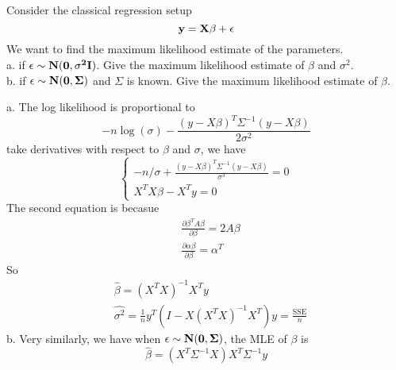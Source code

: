 \documentclass[12pt]{article}
\begin{document}
 {
Consider the classical regression setup
\[\bf{y}=\bf{X}\bf{\beta}+\bf{\epsilon}\]
We want to find the maximum likelihood estimate of the parameters.\\
a. if $\bf{\epsilon}\sim N(\bf{0},\sigma^2\bf{I})$. Give the maximum likelihood estimate of $\beta$ and $\sigma^2$.\\
b. if $\bf{\epsilon}\sim N(\bf{0},\Sigma)$ and $\Sigma$ is known. Give the maximum likelihood estimate of $\beta$.

}

{ \vfill
  \answer
}{ 
  a. The log likelihood is proportional to
  \[-n\log(\sigma)-\frac{(y-X\beta)^T\Sigma^{-1}(y-X\beta)}{2\sigma^2}\]
  take derivatives with respect to $\beta$ and $\sigma$, we have 
  \[\left\{
    \begin{array}{l}  -n/\sigma+\frac{(y-X\beta)^T\Sigma^{-1}(y-X\beta)}{\sigma^3}=0\\
      X^TX\beta-X^Ty=0
     \end{array} \right. \]
  The second equation is becasue
  \begin{align*}
    &\frac{\partial\beta^TA\beta}{\partial \beta}=2A\beta\\
    &\frac{\partial \alpha\beta}{\partial\beta}=\alpha^T
  \end{align*}
  So 
  \begin{align*}
   &\hat{\beta}=(X^TX)^{-1}X^Ty\\
   &\hat{\sigma^2}=\frac{1}{n}y^T(I-X(X^TX)^{-1}X^T)y=\frac{\text{SSE}}{n}
  \end{align*}
b. Very similarly, we have when $\bf{\epsilon}\sim N(\bf{0},\Sigma)$, the MLE of $\beta$ is 
\[\hat{\beta}=(X^T\Sigma^{-1}X)X^T\Sigma^{-1}y\]
}
\end{document}

